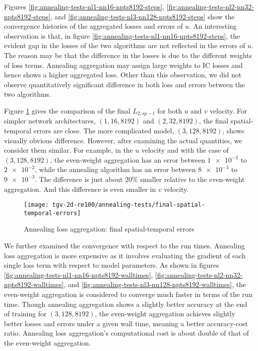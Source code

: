 Figures \ref{fig:annealing-tests-nl1-nn16-npts8192-steps}, \ref{fig:annealing-tests-nl2-nn32-npts8192-steps}, and \ref{fig:annealing-tests-nl3-nn128-npts8192-steps} show the convergence histories of the aggregated losses and errors of $u$.
An interesting observation is that, in figure \ref{fig:annealing-tests-nl1-nn16-npts8192-steps}, the evident gap in the losses of the two algorithms are not reflected in the errors of $u$.
The reason may be that the difference in the losses is due to the different weights of loss terms.
Annealing aggregation may assign large weights to IC losses and hence shows a higher aggregated loss.
Other than this observation, we did not observe quantitatively significant difference in both loss and errors between the two algorithms.

Figure \ref{fig:annealing-tests-final-sterrs} gives the comparison of the final $L_{2,sp-t}$ for both $u$ and $v$ velocity.
For simpler network architectures, $(1, 16, 8192)$ and $(2, 32, 8192)$, the final spatial-temporal errors are close.
The more complicated model, $(3, 128, 8192)$, shows visually obvious difference.
However, after examining the actual quantities, we consider them similar.
For example, in the $u$ velocity and with the case of $(3, 128, 8192)$, the even-weight aggregation has an error between $\num{1e-2}$ to $\num{2e-2}$, while the annealing algorithm has an error between $\num{8e-3}$ to $\num{9e-3}$.
The difference is just about $20\%$ smaller relative to the even-weight aggregation.
And this difference is even smaller in $v$ velocity.

\begin{figure}[hbt!]
    \centering%
    \texttt{[image: tgv-2d-re100/annealing-tests/final-spatial-temporal-errors]}%
    \caption[%
        Annealing loss aggregation: final spatial-temporal errors%
    ]{%
        Annealing loss aggregation: final spatial-temporal errors%
    }\label{fig:annealing-tests-final-sterrs}%
\end{figure}

We further examined the convergence with respect to the run times.
Annealing loss aggregation is more expensive as it involves evaluating the gradient of each single loss term with respect to model parameters.
As shown in figures \ref{fig:annealing-tests-nl1-nn16-npts8192-walltimes}, \ref{fig:annealing-tests-nl2-nn32-npts8192-walltimes}, and \ref{fig:annealing-tests-nl3-nn128-npts8192-walltimes}, the even-weight aggregation is considered to converge much faster in terms of the run time.
Though annealing aggregation shows a slightly better accuracy at the end of training for $(3, 128, 8192)$, the even-weight aggregation achieves slightly better losses and errors under a given wall time, meaning a better accuracy-cost ratio.
Annealing loss aggregation's computational cost is about double of that of the even-weight aggregation. 

